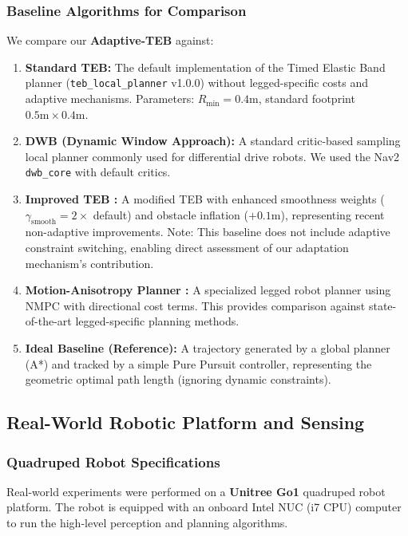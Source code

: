 \documentclass[lettersize,journal]{IEEEtran}
\begin{document}
\subsubsection{Baseline Algorithms for Comparison}
We compare our \textbf{Adaptive-TEB} against:
\begin{enumerate}
\item \textbf{Standard TEB:} The default implementation of the Timed Elastic Band planner (\texttt{teb\_local\_planner} v1.0.0) without legged-specific costs and adaptive mechanisms. Parameters: $R_{\min} = 0.4\text{m}$, standard footprint $0.5\text{m} \times 0.4\text{m}$.
\item \textbf{DWB (Dynamic Window Approach):} A standard critic-based sampling local planner commonly used for differential drive robots. We used the Nav2 \texttt{dwb\_core} with default critics.
\item \textbf{Improved TEB \cite{sun_improved_2022}:} A modified TEB with enhanced smoothness weights ($\gamma_{\text{smooth}} = 2\times$ default) and obstacle inflation ($+0.1\text{m}$), representing recent non-adaptive improvements. Note: This baseline does not include adaptive constraint switching, enabling direct assessment of our adaptation mechanism's contribution.
\item \textbf{Motion-Anisotropy Planner \cite{zhangAgileSafeTrajectory2024}:} A specialized legged robot planner using NMPC with directional cost terms. This provides comparison against state-of-the-art legged-specific planning methods.
\item \textbf{Ideal Baseline (Reference):} A trajectory generated by a global planner (A*) and tracked by a simple Pure Pursuit controller, representing the geometric optimal path length (ignoring dynamic constraints).
\end{enumerate}

\subsection{Real-World Robotic Platform and Sensing}

\subsubsection{Quadruped Robot Specifications}
Real-world experiments were performed on a \textbf{Unitree Go1} quadruped robot platform. The robot is equipped with an onboard Intel NUC (i7 CPU) computer to run the high-level perception and planning algorithms.
\end{document}
